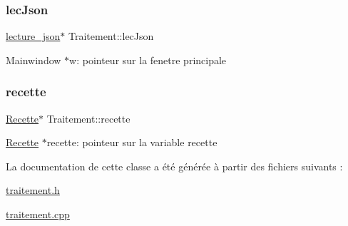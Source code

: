 \subsubsection{\texorpdfstring{lec\+Json}{lecJson}}
{\footnotesize\ttfamily \hyperlink{classlecture__json}{lecture\+\_\+json}$\ast$ Traitement\+::lec\+Json\hspace{0.3cm}{\ttfamily [private]}}

Mainwindow $\ast$w\+: pointeur sur la fenetre principale \mbox{\label{classTraitement_afc8ac78bded6d17a86323544aa00d91b}} 
\subsubsection{\texorpdfstring{recette}{recette}}
{\footnotesize\ttfamily \hyperlink{classRecette}{Recette}$\ast$ Traitement\+::recette\hspace{0.3cm}{\ttfamily [private]}}

\hyperlink{classRecette}{Recette} $\ast$recette\+: pointeur sur la variable recette 

La documentation de cette classe a été générée à partir des fichiers suivants \+:\begin{DoxyCompactItemize}
\item 
\hyperlink{traitement_8h}{traitement.\+h}\item 
\hyperlink{traitement_8cpp}{traitement.\+cpp}\end{DoxyCompactItemize}
